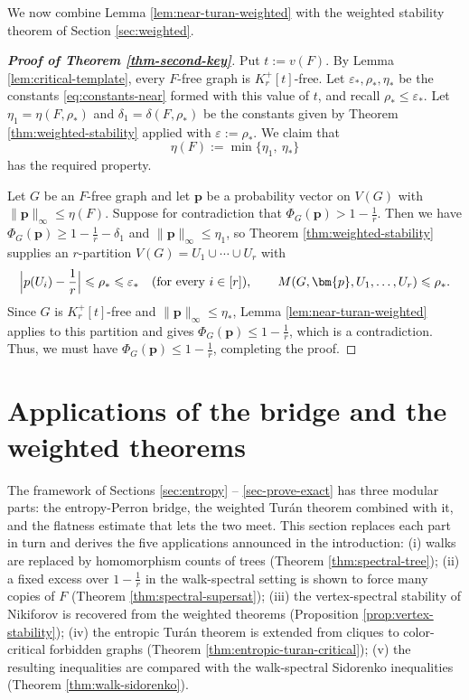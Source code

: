 \documentclass[11pt, a4paper]{article}
\theoremstyle{definition}
\theoremstyle{plain}
\renewcommand{\le}{\leqslant}
\renewcommand{\ge}{\geqslant}
\begin{document}
We now combine Lemma \ref{lem:near-turan-weighted} with the weighted stability theorem of Section \ref{sec:weighted}. 


\begin{proof}[{\bf Proof of Theorem
  \ref{thm-second-key}}]
Put $t:=v(F)$. By Lemma
\ref{lem:critical-template}, every $F$-free graph is
$K_r^+[t]$-free. Let $\varepsilon_*,\rho_*,\eta_*$
be the constants \eqref{eq:constants-near} formed
with this value of $t$, and recall
$\rho_*\le \varepsilon_*$. Let
$\eta_1=\eta (F,\rho_*)$ and
$\delta_1=\delta (F,\rho_*)$ be the constants given
by Theorem \ref{thm:weighted-stability} applied
with $\varepsilon :=\rho_*$. We claim that
\[
  \eta (F):=\min \{\eta_1,\ \eta_*\}
\]
has the required property.

Let $G$ be an $F$-free graph and let $\bm{p}$ be a
probability vector on $V(G)$ with
$\lVert \bm{p}\rVert_\infty \le \eta (F)$. 
Suppose for contradiction that
$\Phi_G(\bm{p})>1-\frac1r$. Then we have  
$\Phi_G(\bm{p})\ge 1-\frac1r-\delta_1$ and
$\lVert \bm{p}\rVert_\infty \le \eta_1$, so Theorem
\ref{thm:weighted-stability} supplies an $r$-partition
$V(G)=U_1\cup \cdots \cup U_r$ with
\[
  \Bigl|p(U_i)-\frac1r\Bigr|\le \rho_*
  \le \varepsilon_* \quad (\text{for every}~i\in [r]),
  \qquad
  M(G,\bm{p},U_1,\ldots ,U_r)\le \rho_* .
\]
Since $G$ is $K_r^+[t]$-free and
$\lVert \bm{p}\rVert_\infty \le \eta_*$, Lemma
\ref{lem:near-turan-weighted} applies to this
partition and gives $\Phi_G(\bm{p})\le 1-\frac1r$,
which is a contradiction. Thus, we must have $\Phi_G(\bm{p}) \le 1- \frac{1}{r}$, completing the proof. 
\end{proof}








\section{Applications of the bridge and the weighted theorems}

\label{sec:applications} 


The framework of Sections \ref{sec:entropy} -- 
\ref{sec-prove-exact} has three modular parts: the entropy-Perron bridge, the weighted Tur\'{a}n theorem combined with it, 
and the flatness estimate that lets the two meet.
This section replaces each part in turn and derives the five applications announced in the introduction:  
(i) walks are replaced by homomorphism counts of trees (Theorem \ref{thm:spectral-tree});  
(ii) a fixed excess over $1-\frac1r$ in the walk-spectral setting is shown to force many copies of $F$ (Theorem \ref{thm:spectral-supersat});  
(iii) the vertex-spectral stability of Nikiforov is
recovered from the weighted theorems (Proposition
\ref{prop:vertex-stability});  
(iv) the entropic Tur\'an theorem is extended from cliques to color-critical forbidden graphs (Theorem \ref{thm:entropic-turan-critical}); 
(v) the resulting inequalities are compared with the walk-spectral Sidorenko inequalities (Theorem \ref{thm:walk-sidorenko}). 
 
\end{document}
